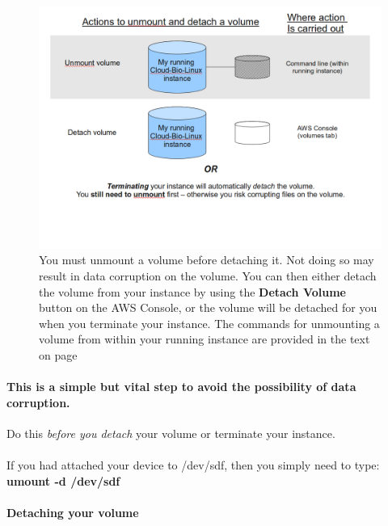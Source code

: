 \begin{figure}[!hd]
	\fbox
	{
		\begin{minipage}{13cm}
\includegraphics[width=\maxwidth]{"images/unmountDetach-1"}
\caption[Attaching a volume]{\label{fig:unmountdetach}You must unmount a volume before detaching it. Not doing so may result in data corruption on the volume. You can then either detach the volume from your instance by using the \textbf{Detach Volume} button on the AWS Console, or the volume will be detached for you when you terminate your instance. The commands for unmounting a volume from within your running instance are provided in the text on page \pageref{text:unmounting}}
		\end{minipage}
	}
\end{figure}

\paragraph{This is a simple but vital step to avoid the possibility of data corruption.} Do this \emph{before you detach} your volume or terminate your instance.

\paragraph{}If you had attached your device to /dev/sdf, then you simply need to type:
\\\textbf{umount -d /dev/sdf}
\label{text:unmounting}
\paragraph{Detaching your volume}
